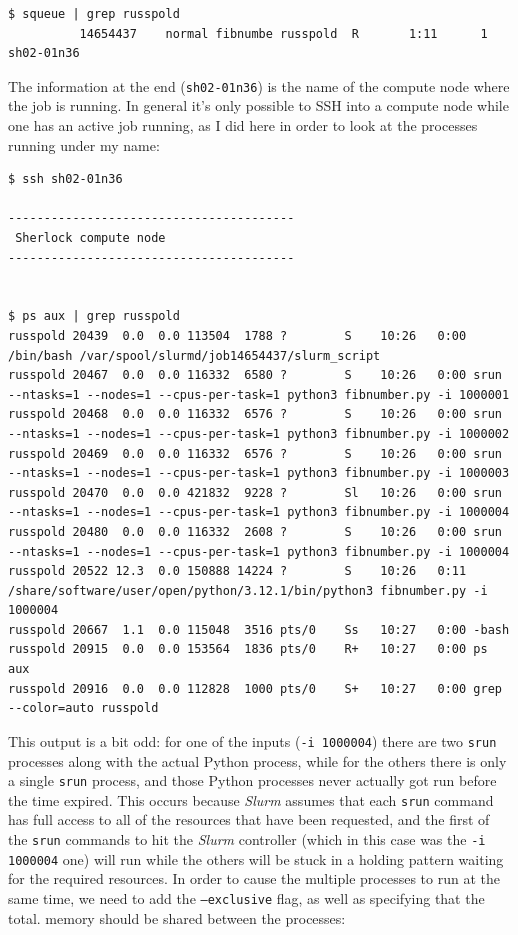 \begin{lstlisting}[style=shellshort]
$ squeue | grep russpold
          14654437    normal fibnumbe russpold  R       1:11      1 sh02-01n36
\end{lstlisting}

The information at the end (\texttt{sh02-01n36}) is the name of the compute node where the job is running. In general it's only possible to SSH into a compute node while one has an active job running, as I did here in order to look at the processes running under my name:

\begin{lstlisting}[style=shell]
$ ssh sh02-01n36

----------------------------------------
 Sherlock compute node
----------------------------------------


$ ps aux | grep russpold
russpold 20439  0.0  0.0 113504  1788 ?        S    10:26   0:00 /bin/bash /var/spool/slurmd/job14654437/slurm_script
russpold 20467  0.0  0.0 116332  6580 ?        S    10:26   0:00 srun --ntasks=1 --nodes=1 --cpus-per-task=1 python3 fibnumber.py -i 1000001
russpold 20468  0.0  0.0 116332  6576 ?        S    10:26   0:00 srun --ntasks=1 --nodes=1 --cpus-per-task=1 python3 fibnumber.py -i 1000002
russpold 20469  0.0  0.0 116332  6576 ?        S    10:26   0:00 srun --ntasks=1 --nodes=1 --cpus-per-task=1 python3 fibnumber.py -i 1000003
russpold 20470  0.0  0.0 421832  9228 ?        Sl   10:26   0:00 srun --ntasks=1 --nodes=1 --cpus-per-task=1 python3 fibnumber.py -i 1000004
russpold 20480  0.0  0.0 116332  2608 ?        S    10:26   0:00 srun --ntasks=1 --nodes=1 --cpus-per-task=1 python3 fibnumber.py -i 1000004
russpold 20522 12.3  0.0 150888 14224 ?        S    10:26   0:11 /share/software/user/open/python/3.12.1/bin/python3 fibnumber.py -i 1000004
russpold 20667  1.1  0.0 115048  3516 pts/0    Ss   10:27   0:00 -bash
russpold 20915  0.0  0.0 153564  1836 pts/0    R+   10:27   0:00 ps aux
russpold 20916  0.0  0.0 112828  1000 pts/0    S+   10:27   0:00 grep --color=auto russpold
\end{lstlisting}

This output is a bit odd: for one of the inputs (\texttt{-i 1000004}) there are two \texttt{srun} processes along with the actual Python process, while for the others there is only a single \texttt{srun} process, and those Python processes never actually got run before the time expired. This occurs because \textit{Slurm} assumes that each \texttt{srun} command has full access to all of the resources that have been requested, and the first of the \texttt{srun} commands to hit the \textit{Slurm} controller (which in this case was the \texttt{-i 1000004} one) will run while the others will be stuck in a holding pattern waiting for the required resources.  In order to cause the multiple processes to run at the same time, we need to add the \texttt{--exclusive} flag, as well as specifying that the total. memory should be shared between the processes:

